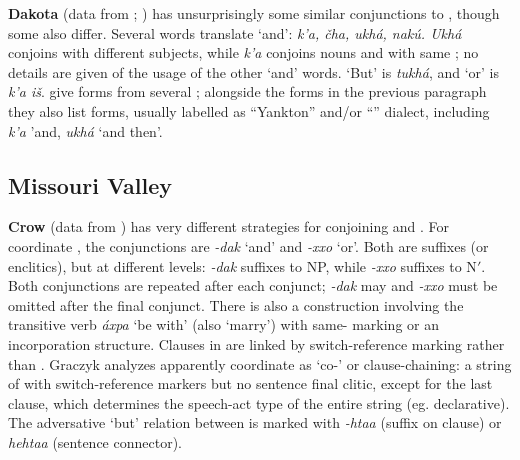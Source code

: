 \documentclass[output=paper]{LSP/langsci}
\begin{document}
\textbf{Dakota} (data from \citealt{Riggs1851};  \citealt{BoasDeloria1941}) has unsurprisingly some similar conjunctions to , though some also differ. Several words translate `and': \textit{k'a, \v{c}ha, ukhá, nakú. Ukhá} conjoins  with different subjects, while \textit{k'a} conjoins nouns and  with same ; no details are given of the usage of the other `and' words. `But' is \textit{tukhá}, and `or' is \textit{k'a i\v{s}}. \citeauthor{BoasDeloria1941} give forms from several ; alongside the  forms in the previous paragraph they also list  forms, usually labelled as ``Yankton'' and/or ``'' dialect, including \textit{k'a} 'and, \textit{ukhá} `and then'.     

\subsection{Missouri Valley}
 
\textbf{Crow} (data from \citealt{Graczyk2007}) has very different strategies for conjoining  and
. For coordinate , the conjunctions are \textit{-dak} `and' and \textit{-xxo} `or'. Both are suffixes (or enclitics), but at different levels: \textit{-dak} suffixes to NP, while \textit{-xxo} suffixes to N$'$. Both conjunctions are repeated after each conjunct; \textit{-dak} may and \textit{-xxo} must be omitted after the final conjunct. There is also a  construction involving the transitive verb \textit{áxpa} `be with' (also `marry') with same- marking or an incorporation structure. Clauses in  are linked by switch-reference marking rather than . Graczyk analyzes apparently coordinate  as `co-' or clause-chaining: a string of  with switch-reference markers but no sentence final clitic, except for the last clause, which determines the speech-act type of the entire string (eg. declarative). The adversative `but' relation between  is marked with \textit{-htaa} (suffix on clause) or \textit{hehtaa} (sentence connector).
\end{document}
